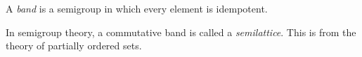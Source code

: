 \documentclass[12pt]{article}
\begin{document}
A \emph{band} is a semigroup in which every element is idempotent.

In semigroup theory, a commutative band is called a \emph{semilattice}.  This is  from the theory of partially ordered sets.
\end{document}
